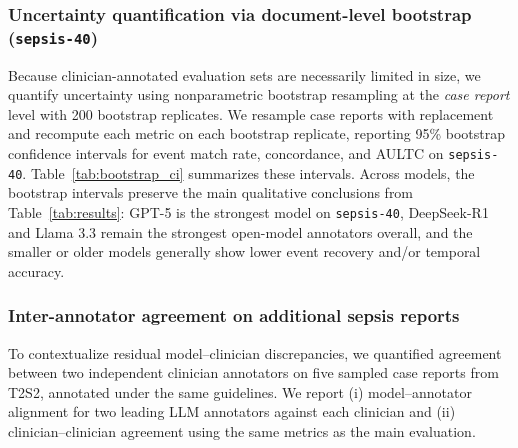 \documentclass[pmlr,twocolumn,10pt]{jmlr} %
\begin{document}
\subsubsection{Uncertainty quantification via document-level bootstrap (\texttt{sepsis-40})}
Because clinician-annotated evaluation sets are necessarily limited in size, we quantify uncertainty using nonparametric bootstrap resampling at the \emph{case report} level with 200 bootstrap replicates. We resample case reports with replacement and recompute each metric on each bootstrap replicate, reporting 95\% bootstrap confidence intervals for event match rate, concordance, and AULTC on \texttt{sepsis-40}. Table~\ref{tab:bootstrap_ci} summarizes these intervals. 
Across models, the bootstrap intervals preserve the main qualitative conclusions from Table~\ref{tab:results}: GPT-5 is the strongest model on \texttt{sepsis-40}, DeepSeek-R1 and Llama 3.3 remain the strongest open-model annotators overall, and the smaller or older models generally show lower event recovery and/or temporal accuracy.

\begin{table}[t]
\centering
\small
\caption{Case report bootstrap 95\% confidence intervals (CIs) on \texttt{sepsis-40}. The bootstrap resamples \emph{case reports} with replacement and recomputes metrics per replicate.}
\label{tab:bootstrap_ci}
\end{table}

\subsubsection{Inter-annotator agreement on additional sepsis reports}
\label{sec:iaa}
To contextualize residual model--clinician discrepancies, we quantified agreement between two independent clinician annotators on five sampled case reports from T2S2, annotated under the same guidelines. We report (i) model--annotator alignment for two leading LLM annotators against each clinician and (ii) clinician--clinician agreement using the same metrics as the main evaluation.
\end{document}
